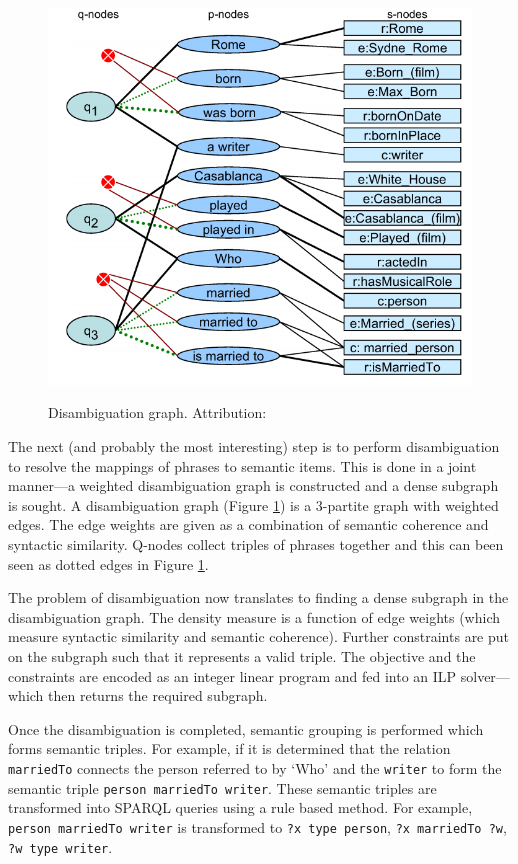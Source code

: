 \documentclass[a4paper, twoside, 12pt]{report}
\begin{document}
\begin{figure}
  \center
  \includegraphics[scale=0.5]{./deanna1.png}
  \label{fig:disgraph}
  \caption{Disambiguation graph. Attribution: \cite{yahya2012deep}}
\end{figure}

The next (and probably the most interesting) step is to perform disambiguation to resolve the mappings of phrases to semantic items. This is done in a joint manner---a weighted disambiguation graph is constructed and a dense subgraph is sought. A disambiguation graph (Figure \ref{fig:disgraph}) is a 3-partite graph with weighted edges. The edge weights are given as a combination of semantic coherence and syntactic similarity. Q-nodes collect triples of phrases together and this can been seen as dotted edges in Figure \ref{fig:disgraph}.

The problem of disambiguation now translates to finding a dense subgraph in the disambiguation graph. The density measure is a function of edge weights (which measure syntactic similarity and semantic coherence). Further constraints are put on the subgraph such that it represents a valid triple. The objective and the constraints are encoded as an integer linear program and fed into an ILP solver---which then returns the required subgraph.

Once the disambiguation is completed, semantic grouping is performed which forms semantic triples. For example, if it is determined that the relation \texttt{marriedTo} connects the person referred to by `Who' and the \texttt{writer} to form the semantic triple \texttt{person marriedTo writer}. These semantic triples are transformed into SPARQL queries using a rule based method. For example, \texttt{person marriedTo writer} is transformed to \texttt{?x type person}, \texttt{?x marriedTo ?w}, \texttt{?w type writer}.
\end{document}
